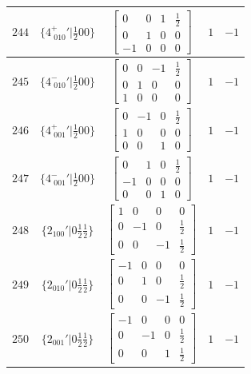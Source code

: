 \documentclass[fleqn,8pt]{jsarticle}
\begin{document}
\begin{longtable}{ccccc}
$ 244 $ & $ \{4^{+}_{\,\,010}{}'|\frac{1}{2} 0 0\} $ & $ \begin{bmatrix} 0 & 0 & 1 & \frac{1}{2} \\ 0 & 1 & 0 & 0 \\ -1 & 0 & 0 & 0 \end{bmatrix} $ & $ 1 $ & $ -1 $ \\ \hline
$ 245 $ & $ \{4^{-}_{\,\,010}{}'|\frac{1}{2} 0 0\} $ & $ \begin{bmatrix} 0 & 0 & -1 & \frac{1}{2} \\ 0 & 1 & 0 & 0 \\ 1 & 0 & 0 & 0 \end{bmatrix} $ & $ 1 $ & $ -1 $ \\ \hline
$ 246 $ & $ \{4^{+}_{\,\,001}{}'|\frac{1}{2} 0 0\} $ & $ \begin{bmatrix} 0 & -1 & 0 & \frac{1}{2} \\ 1 & 0 & 0 & 0 \\ 0 & 0 & 1 & 0 \end{bmatrix} $ & $ 1 $ & $ -1 $ \\ \hline
$ 247 $ & $ \{4^{-}_{\,\,001}{}'|\frac{1}{2} 0 0\} $ & $ \begin{bmatrix} 0 & 1 & 0 & \frac{1}{2} \\ -1 & 0 & 0 & 0 \\ 0 & 0 & 1 & 0 \end{bmatrix} $ & $ 1 $ & $ -1 $ \\ \hline
$ 248 $ & $ \{2{}_{100}{}'|0 \frac{1}{2} \frac{1}{2}\} $ & $ \begin{bmatrix} 1 & 0 & 0 & 0 \\ 0 & -1 & 0 & \frac{1}{2} \\ 0 & 0 & -1 & \frac{1}{2} \end{bmatrix} $ & $ 1 $ & $ -1 $ \\ \hline
$ 249 $ & $ \{2{}_{010}{}'|0 \frac{1}{2} \frac{1}{2}\} $ & $ \begin{bmatrix} -1 & 0 & 0 & 0 \\ 0 & 1 & 0 & \frac{1}{2} \\ 0 & 0 & -1 & \frac{1}{2} \end{bmatrix} $ & $ 1 $ & $ -1 $ \\ \hline
$ 250 $ & $ \{2{}_{001}{}'|0 \frac{1}{2} \frac{1}{2}\} $ & $ \begin{bmatrix} -1 & 0 & 0 & 0 \\ 0 & -1 & 0 & \frac{1}{2} \\ 0 & 0 & 1 & \frac{1}{2} \end{bmatrix} $ & $ 1 $ & $ -1 $ \\ \hline

\end{longtable}
\end{document}
